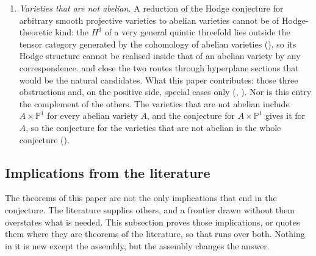 \documentclass[11pt,reqno]{amsart}
\theoremstyle{plain}
\theoremstyle{definition}
\theoremstyle{remark}
\newcommand{\PP}{\mathbb{P}}
\begin{document}
\begin{enumerate}[label=\textup{(C\arabic*)},leftmargin=3.0em,itemsep=4pt]
  \cite{MZ99}, and in dimension eight it does: the self-product of an abelian
  fourfold of Mumford type carries two Hodge classes that are neither
  products of divisor classes nor Weil classes of any quotient
  (). So the Hodge conjecture for abelian varieties
  does not reduce to Weil classes, and the statement needed is the
  algebraicity of these classes themselves. What this paper contributes: the
  example, made exact, and the forms of their algebraicity studied in
  .
\item \emph{Varieties that are not abelian.} A reduction of the Hodge
  conjecture for arbitrary smooth projective varieties to abelian varieties
  cannot be of Hodge-theoretic kind: the $H^{3}$ of a very
  general quintic threefold lies outside the tensor category generated by the
  cohomology of abelian varieties (), so its Hodge
  structure cannot be realised inside that of an abelian variety by any
  correspondence. \cite[Theorem~10.3]{paperI} and \cite[Theorem~10.8]{paperI} close the
  two routes through hyperplane sections that would be the natural candidates.
  What this paper contributes: those three obstructions and, on the positive
  side, special cases only (,
  ). Nor is this entry the complement of the others. The varieties
  that are not abelian include $A\times\PP^{1}$ for every abelian variety
  $A$, and the
  conjecture for $A\times\PP^{1}$ gives it for $A$, so the conjecture for
  the varieties that are not abelian is the whole conjecture
  ().
\end{enumerate}

\subsection{Implications from the literature}\label{ssec:bullseye}

The theorems of this paper are not the only implications that end in the
conjecture. The literature supplies others, and a frontier drawn without
them overstates what is needed. This subsection proves those implications, or
quotes them where they are theorems of the literature, so that
 runs over both. Nothing in it is new
except the assembly, but the assembly changes the answer.
\end{document}
